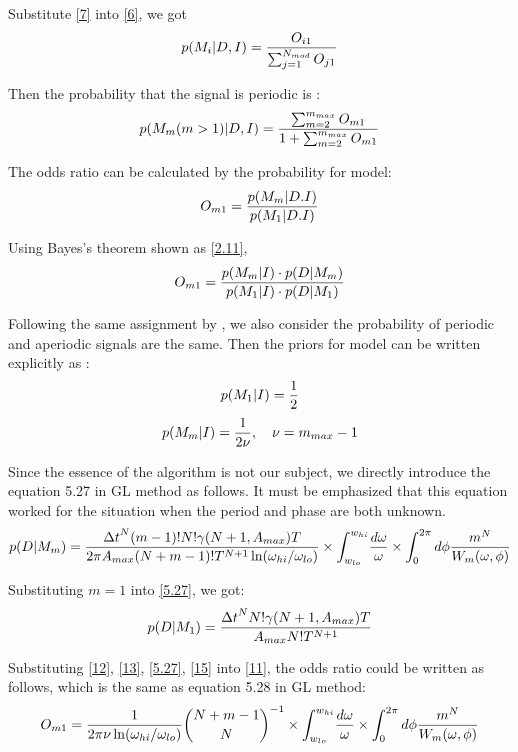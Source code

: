 \documentclass[twoside,twocolumn]{aastex63}
\begin{document}
Substitute \ref{7} into \ref{6}, we got
\begin{equation}\label{2.13}
p(M_i|D,I)={O_{i1}\over {\sum_{j=1}^{N_{mod}} O_{j1}}}
\end{equation}

Then the probability that the signal is periodic is :
\begin{equation}\label{5.2}
p(M_m(m>1)|D,I)={{\sum_{m=2}^{m_{max}} O_{m1}}\over {1+\sum_{m=2}^{m_{max}} O_{m1}}}
\end{equation}

The odds ratio can be calculated by the probability for model:
\begin{equation}
O_{m1}={{p(M_m|D.I)}\over {p(M_1|D.I)}}
\end{equation}

Using Bayes's theorem shown as \ref{2.11},
\begin{equation}\label{11}
O_{m1}={{p(M_m|I)\cdot p(D|M_m)}\over {p(M_1|I)\cdot p(D|M_1)}}
\end{equation}

Following the same assignment by \citep{1992ApJ...398..146G}, we also consider the probability of periodic and aperiodic signals are the same. Then the priors for model can be written explicitly as :
\begin{equation}\label{12}
p(M_1|I)={1\over 2}	
\end{equation}
\begin{equation}\label{13}
p(M_m|I)={1\over {2\nu}}	, \quad \nu =m_{max}-1
\end{equation}

Since the essence of the algorithm is not our subject, we directly introduce the equation 5.27 in GL method as follows. It must be emphasized that this equation worked for the situation when the period and phase are both unknown. 
\begin{equation}\label{5.27}
p(D|M_m)={{{\Delta t}^N (m-1)! N! \gamma(N+1,A_{max})T}\over{2\pi A_{max} (N+m-1)!T^{N+1} \ln(\omega_{hi}/\omega_{lo})}}\times {\int_{w_{lo}}^{w_{hi}}}{{d\omega}\over{\omega}}\times {\int_0^{2\pi}d\phi{m^N\over W_m(\omega,\phi)}}	
\end{equation}

Substituting $m=1$ into \ref{5.27}, we got:
\begin{equation}\label{15}
p(D|M_1)={{{\Delta t}^N N!\gamma(N+1,A_{max})T}\over {A_{max}N!T^{N+1}}}
\end{equation}

Substituting \ref{12}, \ref{13}, \ref{5.27}, \ref{15} into \ref{11}, the odds ratio could be written as follows, which is the same as equation 5.28 in GL method:
\begin{equation}\label{16}
O_{m1}={1\over{2\pi \nu \ln(\omega_{hi}/\omega_{lo})}} {{N+m-1}	\choose N}^{-1}\times {\int_{w_{lo}}^{w_{hi}}}{{d\omega}\over{\omega}}\times {\int_0^{2\pi}d\phi{m^N\over W_m(\omega,\phi)}} 
\end{equation}
\end{document}
